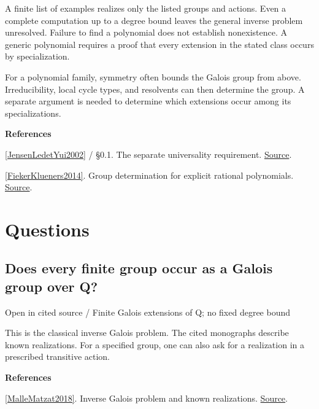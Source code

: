 \documentclass[11pt,a4paper,oneside,openany]{book}
\newenvironment{sources}{\par\smallskip\begingroup\footnotesize\color{atlasgray}\leftskip=10pt\setlength{\parskip}{2pt}}{\par\endgroup\smallskip}
\begin{document}
\begin{atlasblock}[boundary]
\color{black} A finite list of examples realizes only the listed groups and actions. Even a complete computation up to a degree bound leaves the general inverse problem unresolved. Failure to find a polynomial does not establish nonexistence. A generic polynomial requires a proof that every extension in the stated class occurs by specialization.\par
\end{atlasblock}\color{black}
\color{black} For a polynomial family, symmetry often bounds the Galois group from above. Irreducibility, local cycle types, and resolvents can then determine the group. A separate argument is needed to determine which extensions occur among its specializations.\par
\begin{sources}
\textbf{References}\par\smallskip
\noindent\hyperlink{ref:JensenLedetYui2002}{[JensenLedetYui2002]} / §0.1. The separate universality requirement. \href{https://library.slmath.org/books/Book45/index.html}{Source}.\par
\noindent\hyperlink{ref:FiekerKlueners2014}{[FiekerKlueners2014]}. Group determination for explicit rational polynomials. \href{https://doi.org/10.1112/S1461157013000302}{Source}.\par
\end{sources}\color{black}
\section*{Questions}
\subsection*{Does every finite group occur as a Galois group over Q?}
{\small\sffamily\color{atlasgold}Open in cited source / Finite Galois extensions of Q; no fixed degree bound}\par\smallskip
\color{black} This is the classical inverse Galois problem. The cited monographs describe known realizations. For a specified group, one can also ask for a realization in a prescribed transitive action.\par
\begin{sources}
\textbf{References}\par\smallskip
\noindent\hyperlink{ref:MalleMatzat2018}{[MalleMatzat2018]}. Inverse Galois problem and known realizations. \href{https://link.springer.com/book/10.1007/978-3-662-55420-3}{Source}.\par
\end{sources}\color{black}
\end{document}
